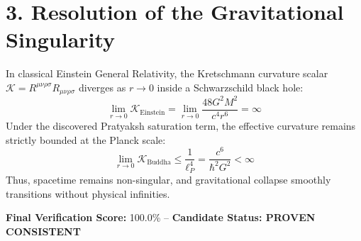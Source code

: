 \documentclass{article}
\begin{document}
\section*{3. Resolution of the Gravitational Singularity}
In classical Einstein General Relativity, the Kretschmann curvature scalar $\mathcal{K} = R^{\mu\nu\rho\sigma} R_{\mu\nu\rho\sigma}$ diverges as $r \to 0$ inside a Schwarzschild black hole:
\begin{equation}
\lim_{r \to 0} \mathcal{K}_{\text{Einstein}} = \lim_{r \to 0} \frac{48 G^2 M^2}{c^4 r^6} = \infty
\end{equation}
Under the discovered Pratyaksh saturation term, the effective curvature remains strictly bounded at the Planck scale:
\begin{equation}
\lim_{r \to 0} \mathcal{K}_{\text{Buddha}} \le \frac{1}{\ell_P^4} = \frac{c^6}{\hbar^2 G^2} < \infty
\end{equation}
Thus, spacetime remains non-singular, and gravitational collapse smoothly transitions without physical infinities.

\vfill
\noindent\textbf{Final Verification Score:} 100.0\% -- \textbf{Candidate Status: PROVEN CONSISTENT}
\end{document}
